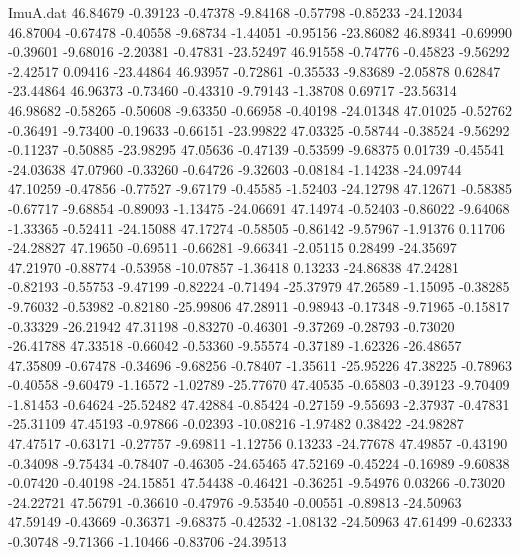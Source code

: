 \begin{filecontents}{ImuA.dat}
  46.84679   -0.39123   -0.47378   -9.84168   -0.57798   -0.85233  -24.12034
  46.87004   -0.67478   -0.40558   -9.68734   -1.44051   -0.95156  -23.86082
  46.89341   -0.69990   -0.39601   -9.68016   -2.20381   -0.47831  -23.52497
  46.91558   -0.74776   -0.45823   -9.56292   -2.42517    0.09416  -23.44864
  46.93957   -0.72861   -0.35533   -9.83689   -2.05878    0.62847  -23.44864
  46.96373   -0.73460   -0.43310   -9.79143   -1.38708    0.69717  -23.56314
  46.98682   -0.58265   -0.50608   -9.63350   -0.66958   -0.40198  -24.01348
  47.01025   -0.52762   -0.36491   -9.73400   -0.19633   -0.66151  -23.99822
  47.03325   -0.58744   -0.38524   -9.56292   -0.11237   -0.50885  -23.98295
  47.05636   -0.47139   -0.53599   -9.68375    0.01739   -0.45541  -24.03638
  47.07960   -0.33260   -0.64726   -9.32603   -0.08184   -1.14238  -24.09744
  47.10259   -0.47856   -0.77527   -9.67179   -0.45585   -1.52403  -24.12798
  47.12671   -0.58385   -0.67717   -9.68854   -0.89093   -1.13475  -24.06691
  47.14974   -0.52403   -0.86022   -9.64068   -1.33365   -0.52411  -24.15088
  47.17274   -0.58505   -0.86142   -9.57967   -1.91376    0.11706  -24.28827
  47.19650   -0.69511   -0.66281   -9.66341   -2.05115    0.28499  -24.35697
  47.21970   -0.88774   -0.53958  -10.07857   -1.36418    0.13233  -24.86838
  47.24281   -0.82193   -0.55753   -9.47199   -0.82224   -0.71494  -25.37979
  47.26589   -1.15095   -0.38285   -9.76032   -0.53982   -0.82180  -25.99806
  47.28911   -0.98943   -0.17348   -9.71965   -0.15817   -0.33329  -26.21942
  47.31198   -0.83270   -0.46301   -9.37269   -0.28793   -0.73020  -26.41788
  47.33518   -0.66042   -0.53360   -9.55574   -0.37189   -1.62326  -26.48657
  47.35809   -0.67478   -0.34696   -9.68256   -0.78407   -1.35611  -25.95226
  47.38225   -0.78963   -0.40558   -9.60479   -1.16572   -1.02789  -25.77670
  47.40535   -0.65803   -0.39123   -9.70409   -1.81453   -0.64624  -25.52482
  47.42884   -0.85424   -0.27159   -9.55693   -2.37937   -0.47831  -25.31109
  47.45193   -0.97866   -0.02393  -10.08216   -1.97482    0.38422  -24.98287
  47.47517   -0.63171   -0.27757   -9.69811   -1.12756    0.13233  -24.77678
  47.49857   -0.43190   -0.34098   -9.75434   -0.78407   -0.46305  -24.65465
  47.52169   -0.45224   -0.16989   -9.60838   -0.07420   -0.40198  -24.15851
  47.54438   -0.46421   -0.36251   -9.54976    0.03266   -0.73020  -24.22721
  47.56791   -0.36610   -0.47976   -9.53540   -0.00551   -0.89813  -24.50963
  47.59149   -0.43669   -0.36371   -9.68375   -0.42532   -1.08132  -24.50963
  47.61499   -0.62333   -0.30748   -9.71366   -1.10466   -0.83706  -24.39513

\end{filecontents}
